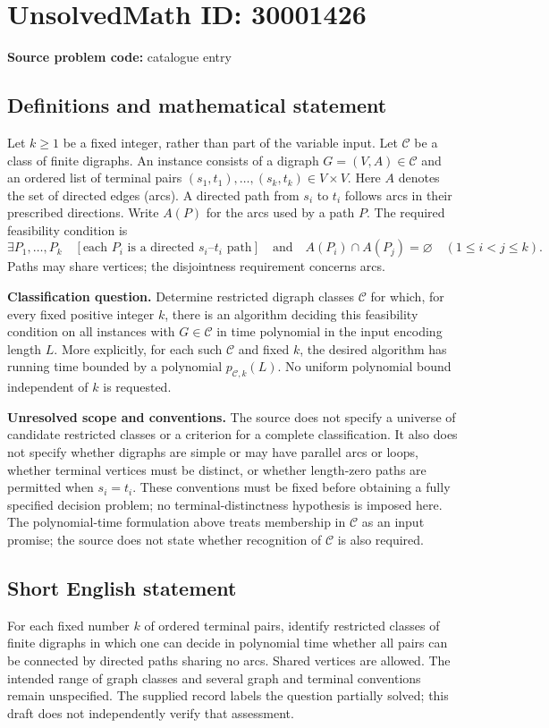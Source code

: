 \documentclass[11pt]{article}
\begin{document}
\section*{UnsolvedMath ID: 30001426}
\textbf{Source problem code:} catalogue entry
\subsection{Definitions and mathematical statement}
Let \(k\geq 1\) be a fixed integer, rather than part of the variable input. Let \(\mathcal C\) be a class of finite digraphs. An instance consists of a digraph \(G=(V,A)\in\mathcal C\) and an ordered list of terminal pairs \((s_1,t_1),\ldots,(s_k,t_k)\in V\times V\). Here \(A\) denotes the set of directed edges (arcs). A directed path from \(s_i\) to \(t_i\) follows arcs in their prescribed directions. Write \(A(P)\) for the arcs used by a path \(P\). The required feasibility condition is
\[
\exists P_1,\ldots,P_k\quad
\left[\text{each }P_i\text{ is a directed }s_i\text{--}t_i\text{ path}\right]
\quad\text{and}\quad
A(P_i)\cap A(P_j)=\varnothing\quad(1\leq i<j\leq k).
\]
Paths may share vertices; the disjointness requirement concerns arcs.

\textbf{Classification question.} Determine restricted digraph classes \(\mathcal C\) for which, for every fixed positive integer \(k\), there is an algorithm deciding this feasibility condition on all instances with \(G\in\mathcal C\) in time polynomial in the input encoding length \(L\). More explicitly, for each such \(\mathcal C\) and fixed \(k\), the desired algorithm has running time bounded by a polynomial \(p_{\mathcal C,k}(L)\). No uniform polynomial bound independent of \(k\) is requested.

\textbf{Unresolved scope and conventions.} The source does not specify a universe of candidate restricted classes or a criterion for a complete classification. It also does not specify whether digraphs are simple or may have parallel arcs or loops, whether terminal vertices must be distinct, or whether length-zero paths are permitted when \(s_i=t_i\). These conventions must be fixed before obtaining a fully specified decision problem; no terminal-distinctness hypothesis is imposed here. The polynomial-time formulation above treats membership in \(\mathcal C\) as an input promise; the source does not state whether recognition of \(\mathcal C\) is also required.
\subsection{Short English statement}
For each fixed number \(k\) of ordered terminal pairs, identify restricted classes of finite digraphs in which one can decide in polynomial time whether all pairs can be connected by directed paths sharing no arcs. Shared vertices are allowed. The intended range of graph classes and several graph and terminal conventions remain unspecified. The supplied record labels the question partially solved; this draft does not independently verify that assessment.
\end{document}
